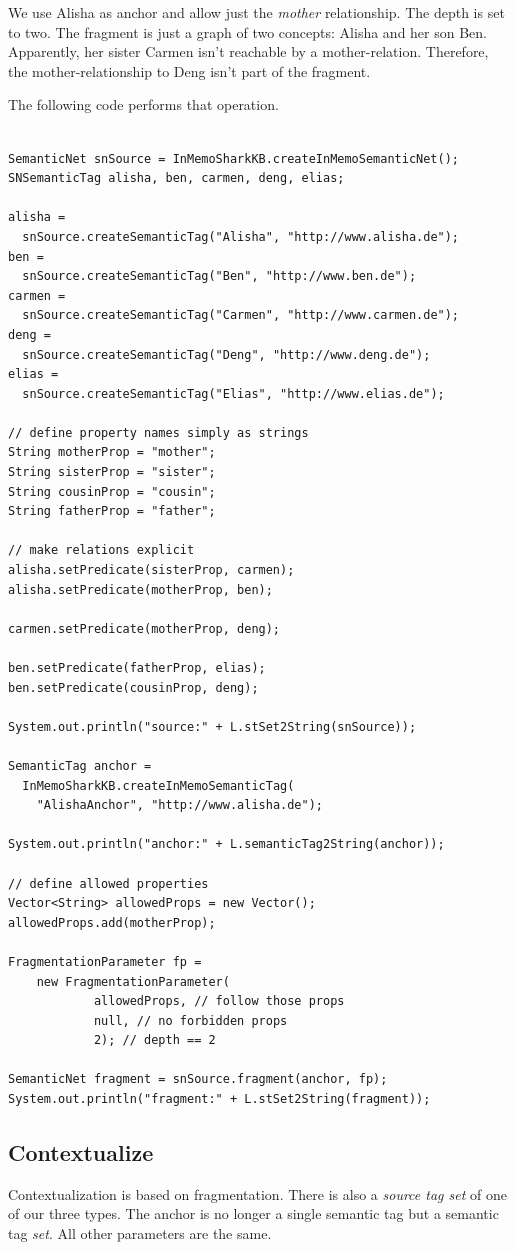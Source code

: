 We use Alisha as anchor and allow just the {\it mother} relationship. The depth is set to two. The fragment is just a graph of two concepts: Alisha and her son Ben. Apparently, her sister Carmen isn't reachable by a mother-relation. Therefore, the mother-relationship to Deng isn't part of the fragment.

The following code performs that operation.

\begin{verbatim}

SemanticNet snSource = InMemoSharkKB.createInMemoSemanticNet();
SNSemanticTag alisha, ben, carmen, deng, elias;

alisha =
  snSource.createSemanticTag("Alisha", "http://www.alisha.de");
ben =
  snSource.createSemanticTag("Ben", "http://www.ben.de");
carmen =
  snSource.createSemanticTag("Carmen", "http://www.carmen.de");
deng =
  snSource.createSemanticTag("Deng", "http://www.deng.de");
elias =
  snSource.createSemanticTag("Elias", "http://www.elias.de");

// define property names simply as strings
String motherProp = "mother";
String sisterProp = "sister";
String cousinProp = "cousin";
String fatherProp = "father";

// make relations explicit
alisha.setPredicate(sisterProp, carmen);
alisha.setPredicate(motherProp, ben);

carmen.setPredicate(motherProp, deng);

ben.setPredicate(fatherProp, elias);
ben.setPredicate(cousinProp, deng);

System.out.println("source:" + L.stSet2String(snSource));

SemanticTag anchor =
  InMemoSharkKB.createInMemoSemanticTag(
    "AlishaAnchor", "http://www.alisha.de");

System.out.println("anchor:" + L.semanticTag2String(anchor));

// define allowed properties
Vector<String> allowedProps = new Vector();
allowedProps.add(motherProp);

FragmentationParameter fp =
    new FragmentationParameter(
            allowedProps, // follow those props
            null, // no forbidden props
            2); // depth == 2

SemanticNet fragment = snSource.fragment(anchor, fp);
System.out.println("fragment:" + L.stSet2String(fragment));
\end{verbatim}

\subsection{Contextualize}
Contextualization is based on fragmentation. There is also a {\it source tag set} of one of our three types. The anchor is no longer a single semantic tag but a semantic tag {\it set}. All other parameters are the same.

